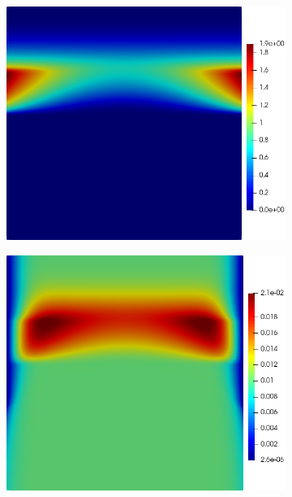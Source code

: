 \documentclass[11pt]{article}
\numberwithin{equation}{section}
\begin{document}
 \begin{figure}[ht]
     \centering
     \begin{subfigure}[t]{0.31\textwidth}
     \includegraphics[width=\textwidth]{Figures/testpics/IncreasedZnAbsorbDMA24.png}
     \caption{}
     \label{fig:absup_DMA}
     \end{subfigure}
     \begin{subfigure}[t]{0.31\textwidth}
     \includegraphics[width=\textwidth]{Figures/testpics/IncreasedZnAbsorbZn24.png}

\end{subfigure}
\end{figure}
\end{document}
